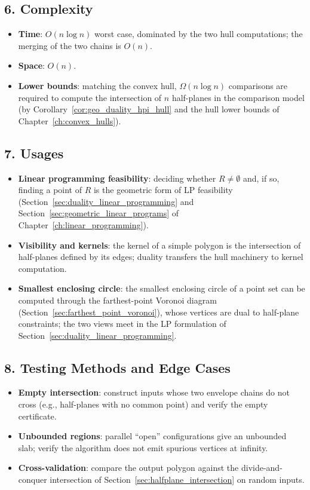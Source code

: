 \subsection{6. Complexity}

\begin{itemize}
\item \textbf{Time}: $O(n \log n)$ worst case, dominated by the two hull
  computations; the merging of the two chains is $O(n)$.
\item \textbf{Space}: $O(n)$.
\item \textbf{Lower bounds}: matching the convex hull, $\Omega(n \log n)$
  comparisons are required to compute the intersection of $n$ half-planes in
  the comparison model (by Corollary~\ref{cor:geo_duality_hpi_hull} and the
  hull lower bounds of Chapter~\ref{ch:convex_hulls}).
\end{itemize}

\subsection{7. Usages}

\begin{itemize}
\item \textbf{Linear programming feasibility}: deciding whether $R \ne
  \emptyset$ and, if so, finding a point of $R$ is the geometric form of LP
  feasibility (Section~\ref{sec:duality_linear_programming} and
  Section~\ref{sec:geometric_linear_programs} of
  Chapter~\ref{ch:linear_programming}).
\item \textbf{Visibility and kernels}: the kernel of a simple polygon is
  the intersection of half-planes defined by its edges; duality transfers
  the hull machinery to kernel computation.
\item \textbf{Smallest enclosing circle}: the smallest enclosing circle of
  a point set can be computed through the farthest-point Voronoi diagram
  (Section~\ref{sec:farthest_point_voronoi}), whose vertices are dual to
  half-plane constraints; the two views meet in the LP formulation of
  Section~\ref{sec:duality_linear_programming}.
\end{itemize}

\subsection{8. Testing Methods and Edge Cases}

\begin{itemize}
\item \textbf{Empty intersection}: construct inputs whose two envelope chains
  do not cross (e.g., half-planes with no common point) and verify the empty
  certificate.
\item \textbf{Unbounded regions}: parallel ``open'' configurations give an
  unbounded slab; verify the algorithm does not emit spurious vertices at
  infinity.
\item \textbf{Cross-validation}: compare the output polygon against the
  divide-and-conquer intersection of Section~\ref{sec:halfplane_intersection}
  on random inputs.
\end{itemize}

